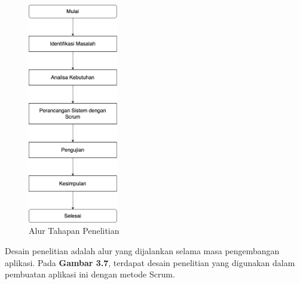 \begin{spacing}{1.5}
\begin{figure}[H]
	\centering
	\includegraphics[width=0.35\textwidth]{gambar/tahapan_penelitian.png}
	\caption{Alur Tahapan Penelitian}
\end{figure}

Desain penelitian adalah alur yang dijalankan selama masa pengembangan aplikasi. Pada \textbf{Gambar 3.7}, terdapat desain penelitian yang digunakan dalam pembuatan aplikasi ini dengan metode Scrum.






\end{spacing}
